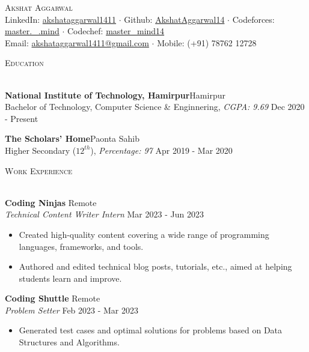 \documentclass[a4paper]{article}
\newcommand{\bulletSep} { \vspace{1.5mm} }
\newcommand{\sectionSep} { \vspace{3mm} }
\newcommand{\lineunder} {
    \vspace*{-8pt} \\
    \hspace*{-15pt} \hrulefill \\
}
\newcommand{\header} [1] {
    {\hspace*{-18pt}\vspace*{6pt} {
        \fontfamily{qcs}\selectfont \large \scshape #1
    }}
    \vspace*{-6pt} \lineunder
    \vspace{0.5mm}
}
\newcommand{\educationItem}[5]{
    \textbf{#1}\hfill #2\\
    #3, \textit{#4} \hfill #5\\
}
\newcommand{\experienceItem}[5]{
    \textbf{#1} \hfill #2 \\
    \textit{#3} \hfill #4 \\
    \begin{itemize}
        #5
    \end{itemize}
}
\begin{document}

\begin{center}
    {\Huge \scshape {}\selectfont Akshat Aggarwal}\\
    \vspace{1mm}
    LinkedIn: \href{https://www.linkedin.com/in/akshataggarwal1411/}{akshataggarwal1411} $\cdot$
    Github: \href{https://github.com/AkshatAggarwal14}{AkshatAggarwal14} $\cdot$
    Codeforces: \href{https://codeforces.com/profile/master._.mind}{master.\_.mind} $\cdot$
    Codechef: \href{https://www.codechef.com/users/master_mind14}{master\_mind14} \\
    \vspace{0.5mm}
    Email: \href {mailto:akshataggarwal1411@gmail.com}{akshataggarwal1411@gmail.com} $\cdot$ Mobile: (+91) 78762 12728\\
\end{center}

\vspace{-3mm}


\header{Education}

\educationItem{National Institute of Technology, Hamirpur}{Hamirpur}{Bachelor of Technology, Computer Science \& Enginnering}{CGPA: 9.69}{Dec 2020 - Present}
\bulletSep

\educationItem{The Scholars' Home}{Paonta Sahib}{Higher Secondary ($12^{th}$)}{Percentage: 97}{Apr 2019 - Mar 2020}
\sectionSep


\header{Work Experience}

\experienceItem{Coding Ninjas}{Remote}{Technical Content Writer Intern}{Mar 2023 - Jun 2023}{
    \item Created high-quality content covering a wide range of programming languages, frameworks, and tools.
    \item Authored and edited technical blog posts, tutorials, etc., aimed at helping students learn and improve.
}
\bulletSep

\experienceItem{Coding Shuttle}{Remote}{Problem Setter}{Feb 2023 - Mar 2023}{
    \item Generated test cases and optimal solutions for problems based on Data Structures and Algorithms.
}
\sectionSep

\end{document}
